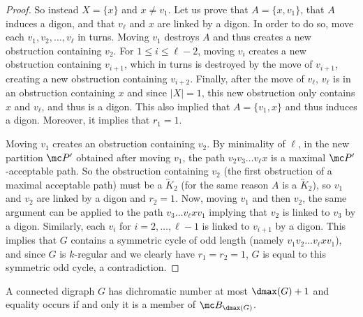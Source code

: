 \begin{proof}
So instead $X = \{x\}$ and $x \neq v_1$. 
Let us prove that $A = \{x,v_1\}$, that $A$ induces a digon, and that $v_{\ell}$ and $x$ are linked by a digon.  
In order to do so, move each $v_1, v_2, \dots, v_{\ell}$ in turns.  
Moving $v_1$ destroys  $A$ and thus  creates a new obstruction containing $v_2$.  
For $1 \leq i \leq \ell-2$, moving $v_i$ creates a new obstruction containing $v_{i+1}$, which in turns is destroyed by the move of $v_{i+1}$, creating a new obstruction containing $v_{i+2}$. %
Finally, after the move of $v_{\ell}$, $v_{\ell}$ is in an obstruction containing $x$ and  since $|X| = 1$, this new obstruction only contains $x$ and $v_{\ell}$, and thus is a digon. This also implied that $A = \{v_1, x\}$ and thus induces a digon. Moreover, it implies that $r_1 = 1$.   

Moving $v_1$ creates an obstruction containing $v_2$. By minimality of $\ell$, in the new partition $\mc P'$ obtained after moving $v_1$, the path $v_2v_3 \dots v_{\ell}x$ is a maximal $\mc P'$-acceptable path. 
So the obstruction containing $v_2$ (the first obstruction of a maximal acceptable path) must be a $\overleftrightarrow K_2$ (for the same reason $A$ is a $\overleftrightarrow K_2$), so $v_1$ and $v_2$ are linked by a digon and $r_2 = 1$. %
Now, moving $v_1$ and then $v_2$, the same argument can be applied to the path $v_3 \dots v_{\ell}xv_1$ implying that $v_2$ is linked to $v_3$ by a digon. %
Similarly, each $v_i$ for $i=2, \dots, \ell-1$ %
is linked to $v_{i+1}$ by a digon. 
This implies that $G$ contains a symmetric cycle of odd length (namely $v_1v_2 \dots v_{\ell}xv_1$), and since $G$ is $k$-regular and we clearly have $r_1 = r_2 =1$, $G$ is equal to this symmetric odd cycle, a contradiction. 
\end{proof}

\begin{theorem}
A connected digraph $G$ has dichromatic number at most $\dmax(G) +1$ and equality occurs if and only it is a member of $\mc B_{\dmax(G)}$. 
\end{theorem}

